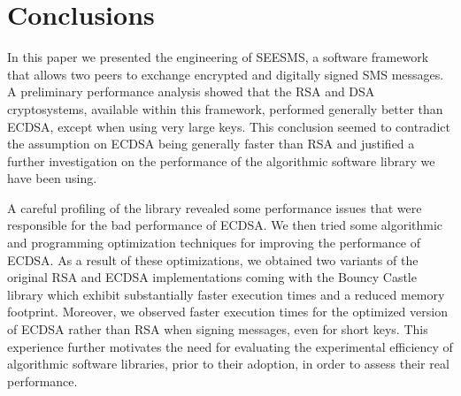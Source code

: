 \documentclass[authoryear]{elsarticle}
\begin{document}
\section{Conclusions}
In this paper we presented the engineering of SEESMS, a software framework that allows two peers to exchange
encrypted and digitally signed SMS  messages. A preliminary performance analysis showed that the RSA and DSA cryptosystems,
available within this framework, performed generally better than ECDSA, except when using very large keys. This conclusion seemed to contradict
the assumption on ECDSA being generally faster than RSA and justified a further investigation on the performance of the algorithmic software library we have been using.

A careful profiling of the library revealed some performance issues that were responsible for the bad performance of ECDSA. We then tried some algorithmic and programming optimization techniques for improving the performance of ECDSA. As a result of these optimizations, we obtained two variants of the original RSA and ECDSA implementations coming with the Bouncy Castle library which exhibit substantially faster execution times and a reduced memory footprint. 
Moreover, we observed faster execution times for the optimized version of ECDSA rather than RSA when signing messages, even for short keys. This experience further motivates the need for evaluating the experimental efficiency of algorithmic software libraries, prior to their adoption, in order to assess their real performance.

%
% 
%
\end{document}
